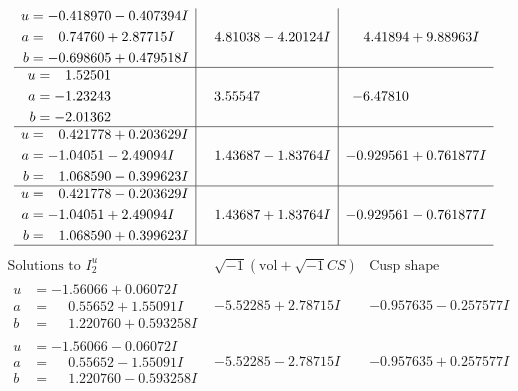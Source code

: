 \documentclass[1p]{elsarticle_modified}
\theoremstyle{definition}
\newcommand{\I}{\sqrt{-1}}
\begin{document}
$$\begin{array}{c|c|c}
\begin{aligned}
u &= -0.418970 - 0.407394 I \\
a &= \phantom{-}0.74760 + 2.87715 I \\
b &= -0.698605 + 0.479518 I\end{aligned}
 & \phantom{-}4.81038 - 4.20124 I & \phantom{-}4.41894 + 9.88963 I \\ \hline\begin{aligned}
u &= \phantom{-}1.52501\phantom{ +0.000000I} \\
a &= -1.23243\phantom{ +0.000000I} \\
b &= -2.01362\phantom{ +0.000000I}\end{aligned}
 & \phantom{-}3.55547\phantom{ +0.000000I} & -6.47810\phantom{ +0.000000I} \\ \hline\begin{aligned}
u &= \phantom{-}0.421778 + 0.203629 I \\
a &= -1.04051 - 2.49094 I \\
b &= \phantom{-}1.068590 - 0.399623 I\end{aligned}
 & \phantom{-}1.43687 - 1.83764 I & -0.929561 + 0.761877 I \\ \hline\begin{aligned}
u &= \phantom{-}0.421778 - 0.203629 I \\
a &= -1.04051 + 2.49094 I \\
b &= \phantom{-}1.068590 + 0.399623 I\end{aligned}
 & \phantom{-}1.43687 + 1.83764 I & -0.929561 - 0.761877 I\\
 \hline 
 \end{array}$$\newpage$$\begin{array}{c|c|c}  
\text{Solutions to }I^u_{2}& \I (\text{vol} + \sqrt{-1}CS) & \text{Cusp shape}\\
 \hline 
\begin{aligned}
u &= -1.56066 + 0.06072 I \\
a &= \phantom{-}0.55652 + 1.55091 I \\
b &= \phantom{-}1.220760 + 0.593258 I\end{aligned}
 & -5.52285 + 2.78715 I & -0.957635 - 0.257577 I \\ \hline\begin{aligned}
u &= -1.56066 - 0.06072 I \\
a &= \phantom{-}0.55652 - 1.55091 I \\
b &= \phantom{-}1.220760 - 0.593258 I\end{aligned}
 & -5.52285 - 2.78715 I & -0.957635 + 0.257577 I \\ \hline\begin{aligned}

\end{aligned}
\end{array}$$
\end{document}
